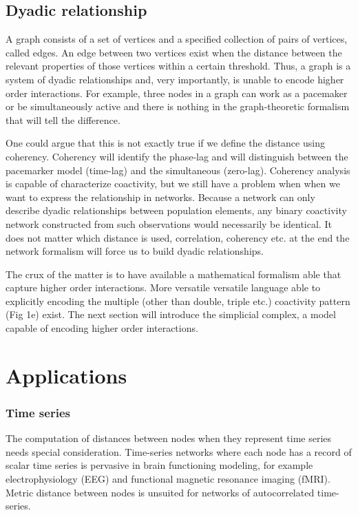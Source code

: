 \documentclass[onecollarge,runningheads]{svjour2}
\begin{document}
\subsection{Dyadic relationship}
A graph consists of a set of vertices and a specified collection of pairs of vertices, called edges. An edge between two vertices exist when the distance between the relevant properties of those vertices within a certain threshold. Thus, a graph is a system of dyadic relationships and, very importantly, is unable to encode higher order interactions. For example, three nodes in a graph can work as a pacemaker or be simultaneously active and there is nothing in the graph-theoretic formalism that will tell the difference.

One could argue that this is not exactly true if we define the distance using coherency.
Coherency will identify the phase-lag and will distinguish between the pacemarker model (time-lag) and the simultaneous (zero-lag). %
Coherency analysis is capable of characterize coactivity, but we still have a problem when   when we want to express the relationship in networks. Because a network can only describe dyadic relationships between population elements, any binary coactivity network constructed from such observations would necessarily be identical. 
It does not matter which distance is used, correlation, coherency etc. at the end the network formalism will force us to build dyadic relationships.

The crux of the matter is to have available a mathematical formalism able that capture higher order interactions. More versatile versatile language able to explicitly encoding the multiple (other than double, triple etc.) coactivity pattern (Fig 1e) exist. 
The next section will introduce the simplicial complex, a model capable of encoding higher order interactions.%
 
\section{}
\label{se:s3}




\section{Applications}
\label{se:s4}

\subsubsection*{Time series}   
The computation of distances between nodes when they represent time series needs special consideration. Time-series networks where each node has a record of scalar time series is pervasive in brain functioning modeling, for example electrophysiology (EEG) and functional magnetic resonance imaging (fMRI).
Metric distance between nodes is unsuited for networks of autocorrelated time-series. 
\end{document}
